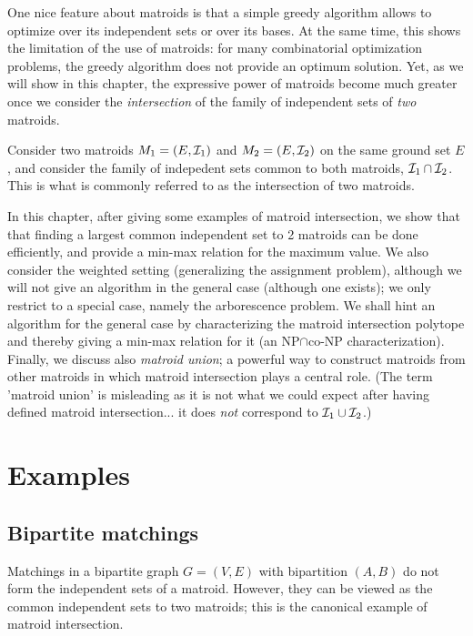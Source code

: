 \documentclass[12pt]{article}
\begin{document}

One nice feature about matroids is that a simple greedy algorithm
allows to optimize over its independent sets or over its bases. At the
same time, this shows the limitation of the use of matroids: for many
combinatorial optimization problems, the greedy algorithm does not
provide an optimum solution. Yet, as we will show in this chapter, the
expressive power of matroids become much greater once we consider the
{\it intersection} of the family of independent sets of {\it two}
matroids. 

Consider two matroids $M_1=(E, {\cal I}_1)$ and $M_2=(E, {\cal I}_2)$
on the same ground set $E$, and consider the family of indepedent sets
common to both matroids, ${\cal I}_1 \cap {\cal I}_2$. This is what is
commonly referred to as the intersection of two matroids. 

In this chapter, after giving some examples of matroid intersection,
we show that that finding a largest common independent set to 2
matroids can be done efficiently, and provide a min-max relation for
the maximum value. We also consider the weighted setting (generalizing
the assignment problem), although we will not give an algorithm in the
general case (although one exists); we only restrict to a special
case, namely the arborescence problem. We shall hint an algorithm for
the general case by characterizing the matroid intersection polytope
and thereby giving a min-max relation for it (an NP$\cap$co-NP
characterization). Finally, we discuss also {\it matroid union}; a
powerful way to construct matroids from other matroids in which
matroid intersection plays a central role. (The term 'matroid union'
is misleading as it is not what we could expect after having defined
matroid intersection... it does {\it not} correspond to ${\cal I}_1\cup
{\cal I}_2$.)

\section{Examples}
\subsection{Bipartite matchings}
Matchings in a bipartite graph $G=(V,E)$ with bipartition $(A,B)$ do
not form the independent sets of a matroid. However, they can be
viewed as the common independent sets to two matroids; this is the
canonical example of matroid intersection. 
\end{document}
